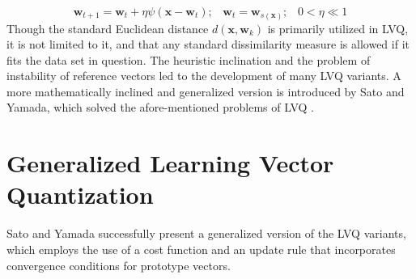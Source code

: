 \documentclass[english]{HSMW-Thesis}
\begin{document}
\begin{equation}\label{update rule}
	\mathbf{w}_{t+1}=\mathbf{w}_{t} + \eta\psi\left( \mathbf{x}-\mathbf{w}_t\right) ;\hspace{10pt} \mathbf{w}_t=\mathbf{w}_{s\left( \mathbf{x}\right) } ; \hspace{10pt} 0<\eta\ll 1
\end{equation}
Though the standard Euclidean distance\hspace{2pt} $d\left( \mathbf{x},\mathbf{w}_k\right) $\hspace{2pt} is primarily utilized in LVQ, it is not limited to it, and that any standard dissimilarity measure is allowed if it fits the data set in question\cite{villmann2017can}.
The heuristic inclination and the problem of instability of reference vectors led to the development of many LVQ variants\cite{kohonen2001learning}. A more mathematically inclined and generalized version is introduced by Sato and Yamada, which solved the afore-mentioned problems of LVQ \cite{sato1996generalized}.
\section{Generalized Learning Vector Quantization}
Sato and Yamada successfully present a generalized version of the LVQ variants, which employs the use of a cost function and an update rule that incorporates convergence conditions for prototype vectors\cite{sato1996generalized}. 
\end{document}
